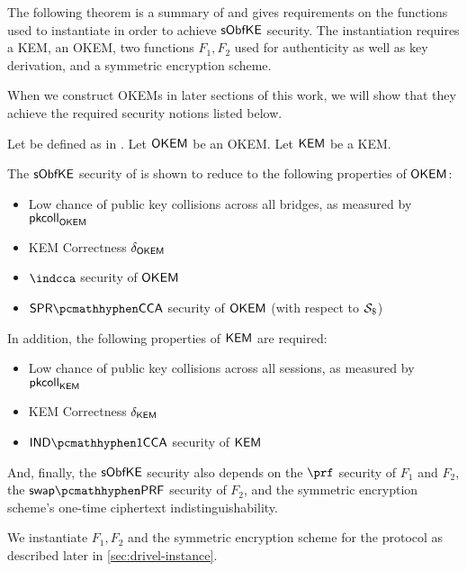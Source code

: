 The following theorem is a summary of \cite[Theorem~5]{EPRINT:GRSV25} and gives requirements on the functions used to instantiate \drivel{} in order to achieve $\mathsf{sObfKE}$ security. The instantiation requires a KEM, an OKEM, two functions $F_1, F_2$ used for authenticity as well as key derivation, and a symmetric encryption scheme.

When we construct OKEMs in later sections of this work, we will show that they achieve the required security notions listed below.

\begin{theorem}
\label{thm:drivel-security}
    Let \drivel{} be defined as in \cite[Fig.~6]{EPRINT:GRSV25}. Let $\mathsf{OKEM}$ be an OKEM. Let $\mathsf{KEM}$ be a KEM.
    
    The $\mathsf{sObfKE}$ security of \drivel{} is shown to reduce to the following properties of $\mathsf{OKEM}$:
    \begin{itemize}
        \item Low chance of public key collisions across all bridges, as measured by $\mathsf{pkcoll}_{\mathsf{OKEM}}$
        \item KEM Correctness $\delta_{\mathsf{OKEM}}$
        \item $\indcca$ security of $\mathsf{OKEM}$
        \item $\sprcca$ security of $\mathsf{OKEM}$ (with respect to $\simulbin$)
    \end{itemize}

    In addition, the following properties of $\mathsf{KEM}$ are required:
    \begin{itemize}
        \item Low chance of public key collisions across all sessions, as measured by $\mathsf{pkcoll}_{\mathsf{KEM}}$
        \item KEM Correctness $\delta_{\mathsf{KEM}}$
        \item $\indonecca$ security of $\mathsf{KEM}$
    \end{itemize}

    And, finally, the $\mathsf{sObfKE}$ security also depends on the $\prf$ security of $F_1$ and $F_2$, the $\swapprf$ security of $F_2$, and the symmetric encryption scheme's one-time ciphertext indistinguishability.    
\end{theorem}

We instantiate $F_1,F_2$ and the symmetric encryption scheme for the \drivel{} protocol as described later in \cref{sec:drivel-instance}.

